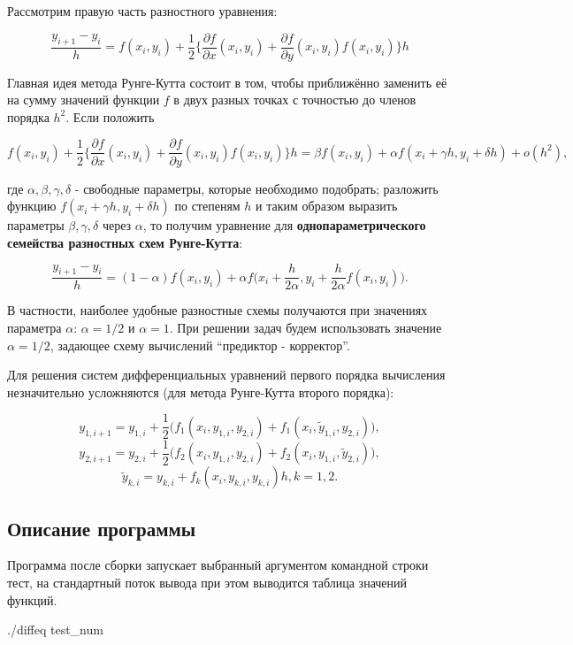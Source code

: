\documentclass[a4paper,11pt]{report}
\begin{document}
Рассмотрим правую часть разностного уравнения:

$$
\frac{y_{i+1} - y_i}{h} = f(x_i, y_i) + \frac{1}{2}\Big\{\frac{\partial f}{\partial x}(x_i, y_i) + \frac{\partial f}{\partial y}
(x_i, y_i)f(x_i, y_i)\Big\}h
$$

Главная идея метода Рунге-Кутта состоит в том, чтобы приближённо заменить её на сумму значений функции $f$ в двух разных точках с 
точностью до членов порядка $h^2$. Если положить

$$
f(x_i, y_i) + \frac{1}{2}\Big\{\frac{\partial f}{\partial x}(x_i, y_i) + \frac{\partial f}{\partial y}
(x_i, y_i)f(x_i, y_i)\Big\}h = \beta f(x_i, y_i) + \alpha f(x_i + \gamma h, y_i + \delta h) + o(h^2),
$$

где $\alpha, \beta, \gamma, \delta$ - свободные параметры, которые необходимо подобрать; разложить функцию $f(x_i + \gamma h, y_i + \delta h)$
по степеням $h$ и таким образом выразить параметры $\beta, \gamma, \delta$ через $\alpha$, то получим уравнение для \textbf{однопараметрического
семейства разностных схем Рунге-Кутта}:

$$
\frac{y_{i+1} - y_i}{h} = (1 - \alpha)f(x_i, y_i) + \alpha f\Big(x_i + \frac{h}{2\alpha}, y_i + \frac{h}{2\alpha}f(x_i, y_i)\Big).
$$

В частности, наиболее удобные разностные схемы получаются при значениях параметра $\alpha$: $\alpha = 1/2$ и $\alpha = 1$. При решении
задач будем использовать значение $\alpha = 1/2$, задающее схему вычислений ``предиктор - корректор''.

Для решения систем дифференциальных уравнений первого порядка вычисления незначительно усложняются (для метода Рунге-Кутта второго порядка):

$$
y_{1,i+1} = y_{1, i} + \frac{1}{2} \Big(f_1(x_i, y_{1, i}, y_{2, i}) + f_1(x_i, \tilde{y}_{1, i}, y_{2, i})\Big),
$$
$$
y_{2,i+1} = y_{2, i} + \frac{1}{2} \Big(f_2(x_i, y_{1, i}, y_{2, i}) + f_2(x_i, y_{1, i}, \tilde{y}_{2, i})\Big),
$$
$$
\tilde{y}_{k, i} = y_{k, i} + f_k(x_i, y_{k, i}, y_{k, i})h, k = 1, 2.
$$

\subsection*{Описание программы}

Программа после сборки запускает выбранный аргументом командной строки тест, на стандартный поток вывода при этом выводится
таблица значений функций.

  ./diffeq test\_num
\end{document}
